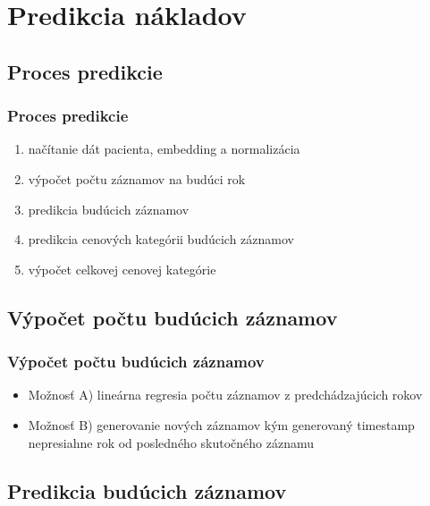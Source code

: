 \documentclass[slovak]{beamer}
\begin{document}
\section{Predikcia nákladov}

\subsection{Proces predikcie}

\begin{frame}
	\frametitle{Proces predikcie}
	\begin{enumerate}
		\item<1> načítanie dát pacienta, embedding a normalizácia
		\item<1> výpočet počtu záznamov na budúci rok
		\item<1> predikcia budúcich záznamov
		\item<1> predikcia cenových kategórii budúcich záznamov
		\item<1> výpočet celkovej cenovej kategórie
	\end{enumerate}
\end{frame}

\subsection{Výpočet počtu budúcich záznamov}

\begin{frame}
	\frametitle{Výpočet počtu budúcich záznamov}
	\begin{itemize}
		\item<1> Možnosť A) lineárna regresia počtu záznamov z predchádzajúcich rokov
		\item<1> Možnosť B) generovanie nových záznamov kým generovaný timestamp nepresiahne rok od posledného skutočného záznamu
	\end{itemize}
\end{frame}

\subsection{Predikcia budúcich záznamov}
\end{document}
